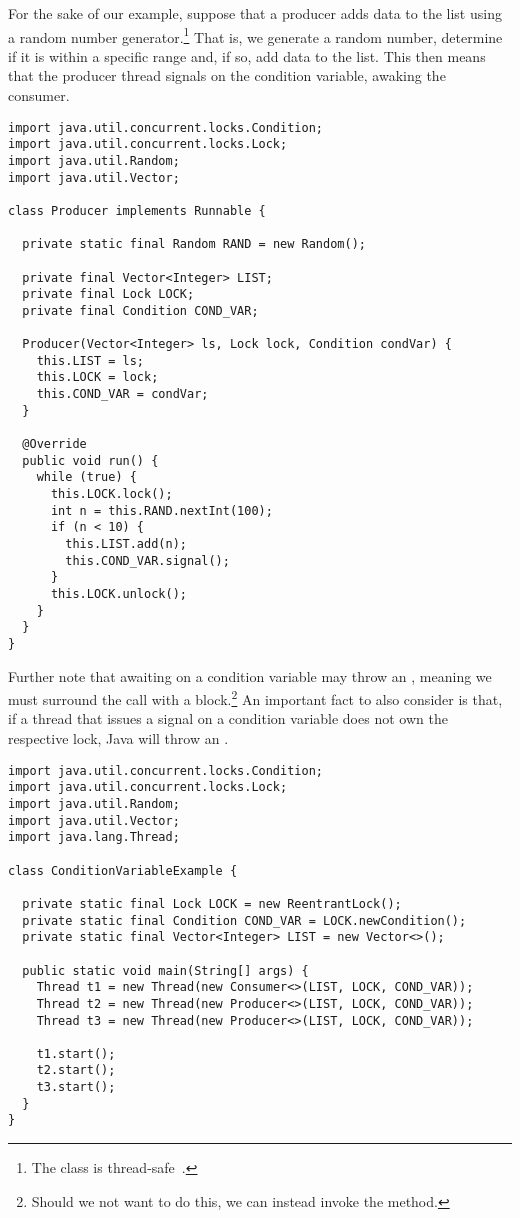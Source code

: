 For the sake of our example, suppose that a producer adds data to the list using a random number generator.\footnote{The  class is thread-safe~.} 
That is, we generate a random number, determine if it is within a specific range and, if so, add data to the list. 
This then means that the producer thread signals on the condition variable, awaking the consumer.

\enlargethispage{-3\baselineskip}
\begin{lstlisting}[language=MyJava]
import java.util.concurrent.locks.Condition;
import java.util.concurrent.locks.Lock;
import java.util.Random;
import java.util.Vector;

class Producer implements Runnable {

  private static final Random RAND = new Random();

  private final Vector<Integer> LIST;
  private final Lock LOCK;
  private final Condition COND_VAR;

  Producer(Vector<Integer> ls, Lock lock, Condition condVar) {
    this.LIST = ls;
    this.LOCK = lock;
    this.COND_VAR = condVar;
  }

  @Override
  public void run() {
    while (true) {
      this.LOCK.lock();
      int n = this.RAND.nextInt(100);
      if (n < 10) {
        this.LIST.add(n);
        this.COND_VAR.signal();
      }
      this.LOCK.unlock();
    }
  }
}
\end{lstlisting}

Further note that awaiting on a condition variable may throw an , meaning we must surround the call with a  block.\footnote{Should we not want to do this, we can instead invoke the  method.} An important fact to also consider is that, if a thread that issues a signal on a condition variable does not own the respective lock, Java will throw an .

\enlargethispage{3\baselineskip}
\begin{lstlisting}[language=MyJava]
import java.util.concurrent.locks.Condition;
import java.util.concurrent.locks.Lock;
import java.util.Random;
import java.util.Vector;
import java.lang.Thread;

class ConditionVariableExample {

  private static final Lock LOCK = new ReentrantLock();
  private static final Condition COND_VAR = LOCK.newCondition();
  private static final Vector<Integer> LIST = new Vector<>();

  public static void main(String[] args) {
    Thread t1 = new Thread(new Consumer<>(LIST, LOCK, COND_VAR));
    Thread t2 = new Thread(new Producer<>(LIST, LOCK, COND_VAR));
    Thread t3 = new Thread(new Producer<>(LIST, LOCK, COND_VAR));

    t1.start();
    t2.start();
    t3.start();
  }
}
\end{lstlisting}


